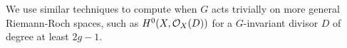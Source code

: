 We use similar techniques to compute when $G$ acts trivially on more general Riemann-Roch spaces, such as $H^0(X,{\cal O}_X(D))$ for a $G$-invariant divisor $D$ of degree at least $2g-1$.


